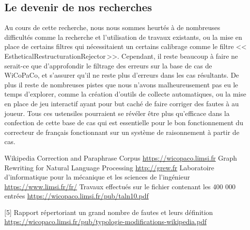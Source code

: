 \documentclass[11pt]{article}
\begin{document}
\subsection{Le devenir de nos recherches}
Au cours de cette recherche, nous nous sommes heurt\'{e}s \`{a} de nombreuses difficult\'{e}s comme la recherche et l'utilisation de travaux existants, ou la mise en place de certains filtres qui n\'{e}cessitaient un certains calibrage comme le filtre <<\,EstheticalRestructurationRejector\,>>.
\newline
Cependant, il reste beaucoup \`{a} faire ne serait-ce que d'approfondir le filtrage des erreurs sur la base de cas de WiCoPaCo, et s'assurer qu'il ne reste plus d'erreurs dans les cas r\'{e}sultants.
\newline
De plus il reste de nombreuses pistes que nous n'avons malheureusement pas eu le temps d'explorer, comme la cr\'{e}ation d'outils de collecte automatiques, ou la mise en place de jeu interactif ayant pour but cach\'{e} de faire corriger des fautes \`{a} au joueur. 
\newline
Tous ces ustensiles pourraient se r\'{e}v\'{e}ler \^{e}tre plus qu'efficace dans la confection de cette base de cas qui est essentielle pour le bon fonctionnement du correcteur de fran\c{c}ais fonctionnant sur un syst\`{e}me de raisonnement \`{a} partir de cas.  





\begin{thebibliography}{1}
   Wikipedia Correction and Paraphrase Corpus \url{https://wicopaco.limsi.fr}
   Graph Rewriting for Natural Language Processing \url{http://grew.fr}
   Laboratoire d'informatique pour la m\'{e}canique et les sciences de l'ing\'{e}nieur \url{https://www.limsi.fr/fr/}
   Travaux effectu\'{e}s sur le fichier contenant les 400 000 entr\'{e}es \url{https://wicopaco.limsi.fr/pub/taln10.pdf}
\end{thebibliography}
[5] Rapport r\'{e}pertoriant un grand nombre de fautes et leurs d\'{e}finition \url{https://wicopaco.limsi.fr/pub/typologie-modifications-wikipedia.pdf}
\end{document}
